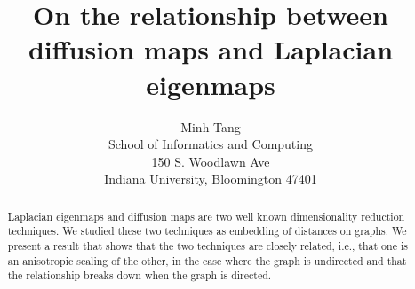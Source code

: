 \documentclass{article}
\begin{document}
\title{On the relationship between diffusion maps and Laplacian
  eigenmaps}
\author{Minh Tang \\ School of Informatics and Computing \\ 150
  S. Woodlawn Ave \\ Indiana University, Bloomington 47401}
\maketitle
\begin{abstract}
  Laplacian eigenmaps and diffusion maps are two well known
  dimensionality reduction techniques. We studied these two techniques
  as embedding of distances on graphs. We present a result that shows
  that the two techniques are closely related, i.e., that one is an
  anisotropic scaling of the other, in the case where the graph is
  undirected and that the relationship breaks down when the graph is
  directed.  
\end{abstract}
\end{document}
